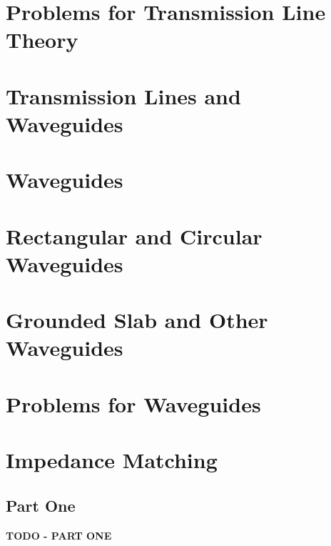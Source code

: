 \documentclass[colorlinks,11pt,a4paper,normalphoto,withhyper,ragged2e]{altareport}
\begin{document}
\pagebreak



\section{Problems for Transmission Line Theory}



\pagebreak



\section{Transmission Lines and Waveguides}



\pagebreak



\section{Waveguides}



\pagebreak



\section{Rectangular and Circular Waveguides}



\pagebreak



\section{Grounded Slab and Other Waveguides}



\pagebreak



\section{Problems for Waveguides}



\pagebreak



\section{Impedance Matching}


\subsection{Part One}
\textbf{TODO - PART ONE}
\end{document}
